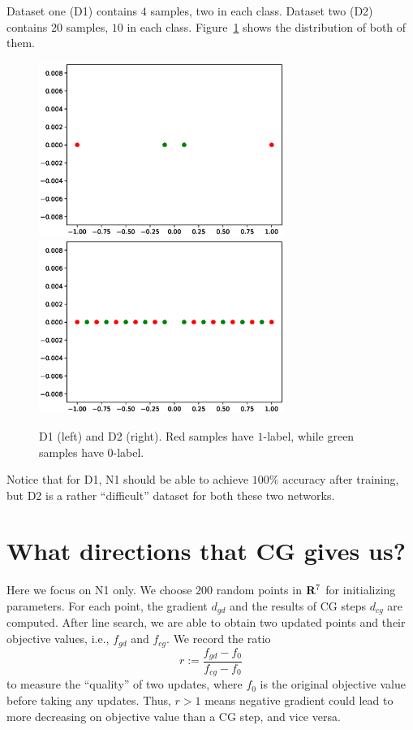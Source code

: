 \documentclass[12pt]{article}
\begin{document}
Dataset one (D1) contains $4$ samples, two in each class. Dataset two (D2) contains $20$ samples, $10$ in each class. Figure~\ref{fig:d}  shows the distribution of both of them.
\begin{figure}[h]
\includegraphics[width=8cm]{data1.eps}
\includegraphics[width=8cm]{data2.eps}
\caption{D1 (left) and D2 (right). Red samples have $1$-label, while green samples have $0$-label.}
\label{fig:d}
\end{figure}

Notice that for D1, N1 should be able to achieve $100\%$ accuracy after training, but D2 is a rather ``difficult'' dataset for both these two networks.

\section{What directions that CG gives us?}

Here we focus on N1 only. We choose $200$ random points in ${\bf R}^7$ for initializing parameters. For each point, the gradient $d_{gd}$ and the results of CG steps $d_{cg}$ are computed. After line search, we are able to obtain two updated points and their objective values, i.e., $f_{gd}$ and $f_{cg}$. We record the ratio
$$ r:=\frac{f_{gd} - f_0}{f_{cg} - f_0 } $$
to measure the ``quality'' of two updates, where $f_0$ is the original objective value before taking any updates. Thus, $r>1$ means negative gradient could lead to more decreasing on objective value than a CG step, and vice versa.
\end{document}
